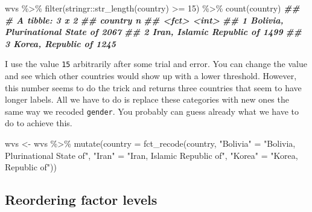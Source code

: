\documentclass[
]{book}
\newenvironment{Shaded}{\begin{snugshade}}{\end{snugshade}}
\newcommand{\AttributeTok}[1]{\textcolor[rgb]{0.77,0.63,0.00}{#1}}
\newcommand{\DecValTok}[1]{\textcolor[rgb]{0.00,0.00,0.81}{#1}}
\newcommand{\DocumentationTok}[1]{\textcolor[rgb]{0.56,0.35,0.01}{\textbf{\textit{#1}}}}
\newcommand{\FunctionTok}[1]{\textcolor[rgb]{0.00,0.00,0.00}{#1}}
\newcommand{\NormalTok}[1]{#1}
\newcommand{\OtherTok}[1]{\textcolor[rgb]{0.56,0.35,0.01}{#1}}
\newcommand{\SpecialCharTok}[1]{\textcolor[rgb]{0.00,0.00,0.00}{#1}}
\newcommand{\StringTok}[1]{\textcolor[rgb]{0.31,0.60,0.02}{#1}}
\begin{document}
\begin{Shaded}
\begin{Highlighting}[]
\NormalTok{wvs }\SpecialCharTok{\%\textgreater{}\%}
  \FunctionTok{filter}\NormalTok{(stringr}\SpecialCharTok{::}\FunctionTok{str\_length}\NormalTok{(country) }\SpecialCharTok{\textgreater{}=} \DecValTok{15}\NormalTok{) }\SpecialCharTok{\%\textgreater{}\%} 
  \FunctionTok{count}\NormalTok{(country)}
\DocumentationTok{\#\# \# A tibble: 3 x 2}
\DocumentationTok{\#\#   country                             n}
\DocumentationTok{\#\#   \textless{}fct\textgreater{}                           \textless{}int\textgreater{}}
\DocumentationTok{\#\# 1 Bolivia, Plurinational State of  2067}
\DocumentationTok{\#\# 2 Iran, Islamic Republic of        1499}
\DocumentationTok{\#\# 3 Korea, Republic of               1245}
\end{Highlighting}
\end{Shaded}

I use the value \texttt{15} arbitrarily after some trial and error. You can change the value and see which other countries would show up with a lower threshold. However, this number seems to do the trick and returns three countries that seem to have longer labels. All we have to do is replace these categories with new ones the same way we recoded \texttt{gender}. You probably can guess already what we have to do to achieve this.

\begin{Shaded}
\begin{Highlighting}[]
\NormalTok{wvs }\OtherTok{\textless{}{-}}\NormalTok{ wvs }\SpecialCharTok{\%\textgreater{}\%}
  \FunctionTok{mutate}\NormalTok{(}\AttributeTok{country =} \FunctionTok{fct\_recode}\NormalTok{(country,}
                                   \StringTok{"Bolivia"} \OtherTok{=} \StringTok{"Bolivia, Plurinational State of"}\NormalTok{,}
                                   \StringTok{"Iran"} \OtherTok{=} \StringTok{"Iran, Islamic Republic of"}\NormalTok{,}
                                   \StringTok{"Korea"} \OtherTok{=} \StringTok{"Korea, Republic of"}\NormalTok{))}
\end{Highlighting}
\end{Shaded}

\hypertarget{reordering-factor-levels}{%
\subsection{Reordering factor levels}\label{reordering-factor-levels}}
\end{document}
